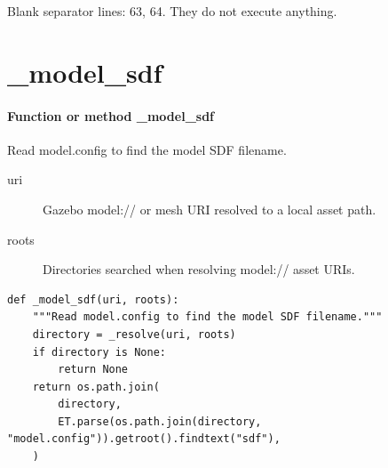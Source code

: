 \documentclass[11pt,a4paper]{book}
\begin{document}
Blank separator lines: 63, 64. They do not execute anything.

\section{\_model\_sdf}

\paragraph{Function or method \_model\_sdf}
Read model.config to find the model SDF filename.

\begin{description}
\item[uri] Gazebo model:// or mesh URI resolved to a local asset path.
\item[roots] Directories searched when resolving model:// asset URIs.
\end{description}

\begin{lstlisting}[firstnumber=65]
def _model_sdf(uri, roots):
    """Read model.config to find the model SDF filename."""
    directory = _resolve(uri, roots)
    if directory is None:
        return None
    return os.path.join(
        directory,
        ET.parse(os.path.join(directory, "model.config")).getroot().findtext("sdf"),
    )


\end{lstlisting}
\end{document}
